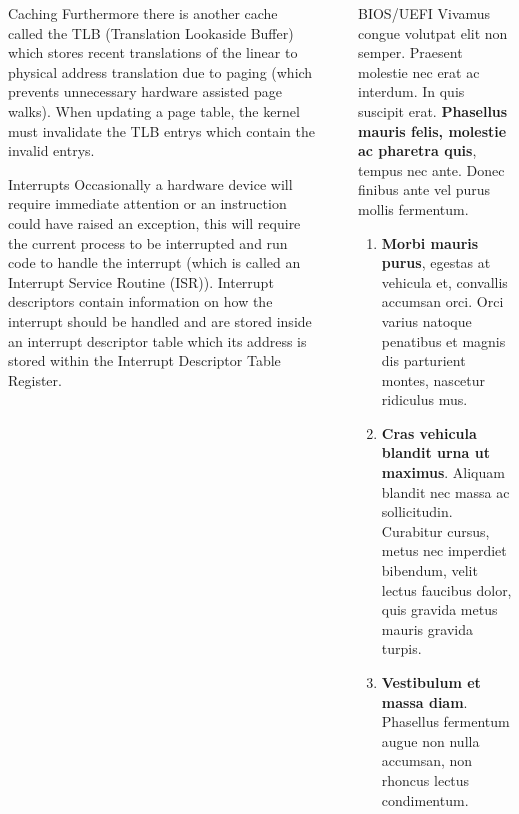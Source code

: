 \documentclass[final]{beamer}
\newlength{\sepwidth}
\newlength{\colwidth}
\newcommand{\separatorcolumn}{\begin{column}{\sepwidth}\end{column}}
\begin{document}
\begin{frame}[t]
\begin{columns}[t]
\begin{column}{\colwidth}
\begin{block}{Caching}
    Furthermore there is another cache called the TLB (Translation Lookaside Buffer) which stores recent translations of the linear to physical address translation due to paging (which prevents unnecessary hardware assisted page walks).
    When updating a page table, the kernel must invalidate the TLB entrys which contain the invalid entrys. 
  \end{block}

  \begin{block}{Interrupts}
    Occasionally a hardware device will require immediate attention or an instruction could have raised an exception, this will require the current process to be interrupted and run code to handle the interrupt (which is called an Interrupt Service Routine (ISR)).
    Interrupt descriptors contain information on how the interrupt should be handled and are stored inside an interrupt descriptor table which its address is stored within the Interrupt Descriptor Table Register.
  \end{block}
\end{column}

\separatorcolumn

\begin{column}{\colwidth}
  \begin{block}{BIOS/UEFI}
    Vivamus congue volutpat elit non semper. Praesent molestie nec erat ac
    interdum. In quis suscipit erat. \textbf{Phasellus mauris felis, molestie
    ac pharetra quis}, tempus nec ante. Donec finibus ante vel purus mollis
    fermentum. 

    \begin{enumerate}
      \item \textbf{Morbi mauris purus}, egestas at vehicula et, convallis
        accumsan orci. Orci varius natoque penatibus et magnis dis parturient
        montes, nascetur ridiculus mus.
      \item \textbf{Cras vehicula blandit urna ut maximus}. Aliquam blandit nec
        massa ac sollicitudin. Curabitur cursus, metus nec imperdiet bibendum,
        velit lectus faucibus dolor, quis gravida metus mauris gravida turpis.
      \item \textbf{Vestibulum et massa diam}. Phasellus fermentum augue non
        nulla accumsan, non rhoncus lectus condimentum.
    \end{enumerate}
  \end{block}


\end{column}
\end{columns}
\end{frame}
\end{document}
